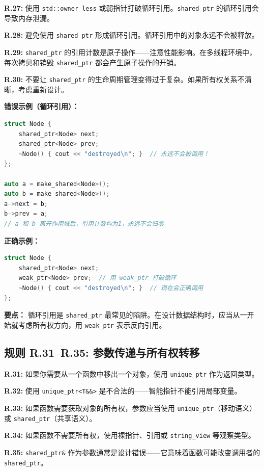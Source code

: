 \textbf{R.27:} 使用 \texttt{std::owner\_less} 或弱指针打破循环引用。\texttt{shared\_ptr} 的循环引用会导致内存泄漏。

\textbf{R.28:} 避免使用 \texttt{shared\_ptr} 形成循环引用。循环引用中的对象永远不会被释放。

\textbf{R.29:} \texttt{shared\_ptr} 的引用计数是原子操作——注意性能影响。在多线程环境中，每次拷贝和销毁 \texttt{shared\_ptr} 都会产生原子操作的开销。

\textbf{R.30:} 不要让 \texttt{shared\_ptr} 的生命周期管理变得过于复杂。如果所有权关系不清晰，考虑重新设计。

\textbf{错误示例（循环引用）：}

\begin{lstlisting}[language=C++]
struct Node {
    shared_ptr<Node> next;
    shared_ptr<Node> prev;
    ~Node() { cout << "destroyed\n"; }  // 永远不会被调用！
};

auto a = make_shared<Node>();
auto b = make_shared<Node>();
a->next = b;
b->prev = a;
// a 和 b 离开作用域后，引用计数均为1，永远不会归零
\end{lstlisting}

\textbf{正确示例：}

\begin{lstlisting}[language=C++]
struct Node {
    shared_ptr<Node> next;
    weak_ptr<Node> prev;  // 用 weak_ptr 打破循环
    ~Node() { cout << "destroyed\n"; }  // 现在会正确调用
};
\end{lstlisting}

\textbf{要点：} 循环引用是 \texttt{shared\_ptr} 最常见的陷阱。在设计数据结构时，应当从一开始就考虑所有权方向，用 \texttt{weak\_ptr} 表示反向引用。

\subsection*{\textbf{规则 R.31--R.35:} 参数传递与所有权转移}

\textbf{R.31:} 如果你需要从一个函数中移出一个对象，使用 \texttt{unique\_ptr} 作为返回类型。

\textbf{R.32:} 使用 \texttt{unique\_ptr<T\&\&>} 是不合法的——智能指针不能引用局部变量。

\textbf{R.33:} 如果函数需要获取对象的所有权，参数应当使用 \texttt{unique\_ptr}（移动语义）或 \texttt{shared\_ptr}（共享语义）。

\textbf{R.34:} 如果函数不需要所有权，使用裸指针、引用或 \texttt{string\_view} 等观察类型。

\textbf{R.35:} \texttt{shared\_ptr\&} 作为参数通常是设计错误——它意味着函数可能改变调用者的 \texttt{shared\_ptr}。

